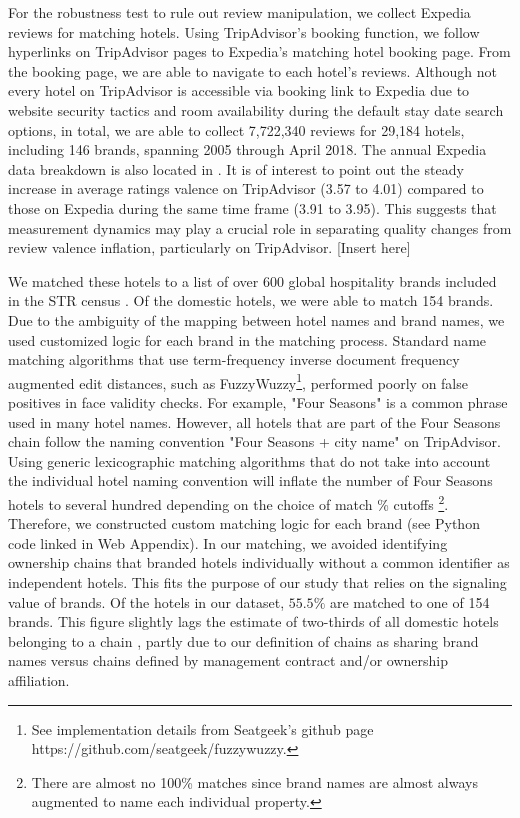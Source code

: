 \documentclass[mksc,blindrev]{informs3} %
\begin{document}
For the robustness test to rule out review manipulation, we collect Expedia reviews for matching hotels. Using TripAdvisor's booking function, we follow hyperlinks on TripAdvisor pages to Expedia's matching hotel booking page. From the booking page, we are able to navigate to each hotel's reviews. Although not every hotel on TripAdvisor is accessible via booking link to Expedia due to website security tactics and room availability during the default stay date search options, in total, we are able to collect 7,722,340 reviews for 29,184 hotels, including 146 brands, spanning 2005 through April 2018. The annual Expedia data breakdown is also located in . It is of interest to point out the steady increase in average ratings valence on TripAdvisor (3.57 to 4.01) compared to those on Expedia during the same time frame (3.91 to 3.95). This suggests that measurement dynamics may play a crucial role in separating quality changes from review valence inflation, particularly on TripAdvisor. 
[Insert  here]

We matched these hotels to a list of over 600 global hospitality brands included in the STR census \citep{hotelnews2015}. Of the domestic hotels, we were able to match 154 brands. Due to the ambiguity of the mapping between hotel names and brand names, we used customized logic for each brand in the matching process. Standard name matching algorithms that use term-frequency inverse document frequency augmented edit distances, such as FuzzyWuzzy\footnote{See implementation details from Seatgeek's github page https://github.com/seatgeek/fuzzywuzzy.}, performed poorly on false positives in face validity checks. For example, "Four Seasons" is a common phrase used in many hotel names. However, all hotels that are part of the Four Seasons chain follow the naming convention "Four Seasons + city name" on TripAdvisor. Using generic lexicographic matching algorithms that do not take into account the individual hotel naming convention will inflate the number of Four Seasons hotels to several hundred depending on the choice of match \% cutoffs \footnote{There are almost no 100\% matches since brand names are almost always augmented to name each individual property.}. Therefore, we constructed custom matching logic for each brand (see Python code linked in Web Appendix). In our matching, we avoided identifying ownership chains that branded hotels individually without a common identifier as independent hotels. This fits the purpose of our study that relies on the signaling value of brands. Of the hotels in our dataset, $55.5\%$ are matched to one of 154 brands. This figure slightly lags the estimate of two-thirds of all domestic hotels belonging to a chain \citep{lodging2017}, partly due to our definition of chains as sharing brand names versus chains defined by management contract and/or ownership affiliation.
\end{document}
